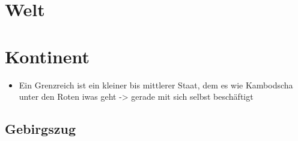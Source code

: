 \section{Welt}
\section{Kontinent}
\begin{itemize}
	\item Ein Grenzreich ist ein kleiner bis mittlerer Staat, dem es wie Kambodscha unter den Roten iwas geht -> gerade mit sich selbst beschäftigt
\end{itemize}

\subsection{Gebirgszug}
